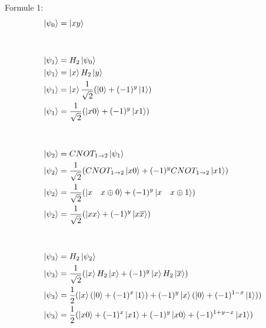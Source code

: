 \documentclass{article}
\begin{document}
Formule 1:
\begin{align*}
    \ket{\psi_0} &= \ket{xy} \\ \\ \\
    \ket{\psi_1} &= H_2\ket{\psi_0} \\
    \ket{\psi_1} &= \ket{x} H_2 \ket{y} \\
    \ket{\psi_1} &= \ket{x}\frac{1}{\sqrt{2}}(\ket{0} + (-1)^y \ket{1}) \\
    \ket{\psi_1} &= \frac{1}{\sqrt{2}}(\ket{x0} + (-1)^y \ket{x1}) \\ \\ \\
    \ket{\psi_2} &= CNOT_{1\rightarrow2}\ket{\psi_1} \\
    \ket{\psi_2} &= \frac{1}{\sqrt{2}}(CNOT_{1\rightarrow2}\ket{x0} + (-1)^y CNOT_{1\rightarrow2} \ket{x1}) \\
    \ket{\psi_2} &= \frac{1}{\sqrt{2}}(\ket{x \quad x\oplus 0} + (-1)^y \ket{x \quad x \oplus 1}) \\
    \ket{\psi_2} &= \frac{1}{\sqrt{2}}(\ket{x x} + (-1)^y \ket{x \overline{x}}) \\ \\ \\
    \ket{\psi_3} &= H_2\ket{\psi_2} \\
    \ket{\psi_3} &= \frac{1}{\sqrt{2}}(\ket{x} H_2\ket{x} + (-1)^y \ket{x} H_2\ket{\overline{x}}) \\
    \ket{\psi_3} &= \frac{1}{2}(\ket{x}(\ket{0} + (-1)^x\ket{1}) + (-1)^y\ket{x}(\ket{0} + (-1)^{1-x}\ket{1})) \\
    \ket{\psi_3} &= \frac{1}{2}(\ket{x0} + (-1)^x\ket{x1} + (-1)^y\ket{x0} + (-1)^{1+y-x}\ket{x1}) \\ \\ \\
\end{align*}
\end{document}
